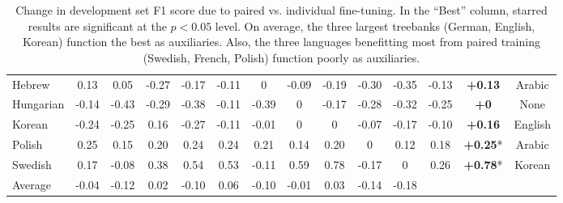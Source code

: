 \documentclass[11pt,a4paper]{article}
\begin{document}
\begin{table*}[h]
{\begin{tabular}{@{}lccccccccccccc@{}}
Hebrew& \cellcolor{yellow!25}\phantom{-}0.13& \cellcolor{yellow!25}\phantom{-}0.05& \cellcolor{orange!25}-0.27& \cellcolor{orange!25}-0.17& \cellcolor{yellow!25}-0.11& \cellcolor{yellow!25}\phantom{-}0\phantom{.00}& \cellcolor{yellow!25}-0.09& \cellcolor{orange!25}-0.19& \cellcolor{orange!25}-0.30& \cellcolor{red!25}-0.35& -0.13& \textbf{+0.13\phantom{*}}&Arabic\\
Hungarian& \cellcolor{yellow!25}-0.14& \cellcolor{red!25}-0.43& \cellcolor{orange!25}-0.29& \cellcolor{red!25}-0.38& \cellcolor{yellow!25}-0.11& \cellcolor{red!25}-0.39& \cellcolor{yellow!25}\phantom{-}0\phantom{.00}& \cellcolor{orange!25}-0.17& \cellcolor{orange!25}-0.28& \cellcolor{red!25}-0.32& -0.25& \textbf{+0\phantom{.00*}}& None\\
Korean& \cellcolor{orange!25}-0.24& \cellcolor{orange!25}-0.25& \cellcolor{lime!33}\phantom{-}0.16& \cellcolor{orange!25}-0.27& \cellcolor{yellow!25}-0.11& \cellcolor{yellow!25}-0.01& \cellcolor{yellow!25}\phantom{-}0\phantom{.00}& \cellcolor{yellow!25}\phantom{-}0\phantom{.00}& \cellcolor{yellow!25}-0.07& \cellcolor{orange!25}-0.17& -0.10&  \textbf{+0.16\phantom{*}}& English\\
Polish& \cellcolor{lime!33}\phantom{-}0.25& \cellcolor{lime!33}\phantom{-}0.15& \cellcolor{lime!33}\phantom{-}0.20& \cellcolor{lime!33}\phantom{-}0.24& \cellcolor{lime!33}\phantom{-}0.24& \cellcolor{lime!33}\phantom{-}0.21& \cellcolor{yellow!25}\phantom{-}0.14& \cellcolor{lime!33}\phantom{-}0.20& \cellcolor{yellow!25}\phantom{-}0\phantom{.00}& \cellcolor{yellow!25}\phantom{-}0.12& \phantom{-}0.18& \textbf{+0.25}*& Arabic\\
Swedish& \cellcolor{lime!33}\phantom{-}0.17& \cellcolor{yellow!25}-0.08& \cellcolor{green!25}\phantom{-}0.38& \cellcolor{green!25}\phantom{-}0.54& \cellcolor{green!25}\phantom{-}0.53& \cellcolor{yellow!25}-0.11& \cellcolor{green!25}\phantom{-}0.59& \cellcolor{green!25}\phantom{-}0.78& \cellcolor{orange!25}-0.17& \cellcolor{yellow!25}\phantom{-}0\phantom{.00}& \phantom{-}0.26& \textbf{+0.78}*& Korean\\
\midrule
Average& -0.04 & -0.12 & \phantom{-}0.02 & -0.10 & \phantom{-}0.06 & -0.10 & -0.01 & \phantom{-}0.03 & -0.14 & -0.18\\
  \bottomrule
\end{tabular}
}
\caption{\label{table:pairs} Change in development set F1 score due to paired vs. individual fine-tuning. In the ``Best'' column, starred results are significant at the $p < 0.05$ level. On average, the three largest treebanks (German, English, Korean) function the best as auxiliaries. Also, the three languages benefitting most from paired training (Swedish, French, Polish) function poorly as auxiliaries.}
\end{table*}
\end{document}
